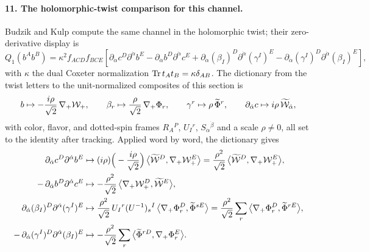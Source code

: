 \paragraph{11. The holomorphic-twist comparison for this channel.}
Budzik and Kulp compute the same channel in the holomorphic twist; their
zero-derivative display \cite[eq.~(3.64)]{BK} is
\begin{equation}\label{eq:ss:seedbk}
Q_1(b^A b^B)
=\kappa^{2} f_{ACD}f_{BCE} \left[
\partial_{\dot\alpha} c^D \partial^{\dot\alpha} b^E
-\partial_{\dot\alpha} b^D\partial^{\dot\alpha} c^E
+\partial_{\dot\alpha}(\beta_I)^D\partial^{\dot\alpha}(\gamma^I)^E
-\partial_{\dot\alpha} (\gamma^I)^D\partial^{\dot\alpha}(\beta_I)^E
\right],
\end{equation}
with $\kappa$ the dual Coxeter normalization $\operatorname{Tr} t_At_B=\kappa\delta_{AB}$.
The dictionary from the twist letters to the unit-normalized composites of
this section is
\begin{equation}\label{eq:ss:seeddictionary}
b\mapsto-\frac{i\rho}{\sqrt2}\,\nabla_{+}\mathcal{W}_{+},
\qquad
\beta_r\mapsto\frac{\rho}{\sqrt2}\,\nabla_{+}\Phi_r,
\qquad
\gamma^r\mapsto\rho\,\widetilde\Phi^{r},
\qquad
\partial_{\dot\alpha}c\mapsto i\rho\,\widetilde{\mathcal{W}}_{\dot\alpha},
\end{equation}
with color, flavor, and dotted-spin frames $R_A{}^P$, $U_I{}^r$,
$S_{\dot\alpha}{}^{\dot\beta}$ and a scale $\rho\neq0$, all set to the
identity after tracking. Applied word by word, the dictionary gives
\begin{align}
\partial_{\dot\alpha} c^D\partial^{\dot\alpha} b^E
&\mapsto
(i\rho)\Big(-\frac{i\rho}{\sqrt2}\Big)\,
\big\langle\widetilde{\mathcal{W}}^{D},\nabla_{+}\mathcal{W}_{+}^{E}\big\rangle
=\frac{\rho^{2}}{\sqrt2}\,
\big\langle\widetilde{\mathcal{W}}^{D},\nabla_{+}\mathcal{W}_{+}^{E}\big\rangle,
\notag\\
-\,\partial_{\dot\alpha} b^D\partial^{\dot\alpha} c^E
&\mapsto
-\frac{\rho^{2}}{\sqrt2}\,
\big\langle\nabla_{+}\mathcal{W}_{+}^{D},\widetilde{\mathcal{W}}^{E}\big\rangle,
\label{eq:ss:seedwordmap}\\
\partial_{\dot\alpha}(\beta_I)^D\partial^{\dot\alpha}(\gamma^I)^E
&\mapsto
\frac{\rho^{2}}{\sqrt2}\,U_I{}^r(U^{-1})_s{}^I\,
\big\langle\nabla_{+}\Phi_r^{D},\widetilde\Phi^{sE}\big\rangle
=\frac{\rho^{2}}{\sqrt2}\sum_r
\big\langle\nabla_{+}\Phi_r^{D},\widetilde\Phi^{rE}\big\rangle,
\notag\\
-\,\partial_{\dot\alpha}(\gamma^I)^D\partial^{\dot\alpha}(\beta_I)^E
&\mapsto
-\frac{\rho^{2}}{\sqrt2}\sum_r
\big\langle\widetilde\Phi^{rD},\nabla_{+}\Phi_r^{E}\big\rangle .
\notag
\end{align}
